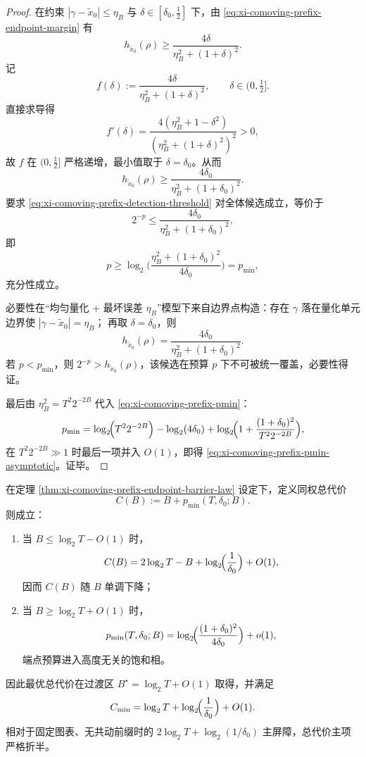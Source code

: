 \begin{proof}
在约束
\(
|\gamma-\tilde x_0|\le\eta_B
\)
与
\(
\delta\in[\delta_0,\tfrac12]
\)
下，由 \eqref{eq:xi-comoving-prefix-endpoint-margin} 有
\[
h_{\tilde x_0}(\rho)
\ge
\frac{4\delta}{\eta_B^2+(1+\delta)^2}.
\]
记
\[
f(\delta):=\frac{4\delta}{\eta_B^2+(1+\delta)^2},
\qquad
\delta\in(0,\tfrac12].
\]
直接求导得
\[
f'(\delta)
=
\frac{4(\eta_B^2+1-\delta^2)}{(\eta_B^2+(1+\delta)^2)^2}
>0,
\]
故 \(f\) 在 \((0,\tfrac12]\) 严格递增，最小值取于 \(\delta=\delta_0\)。从而
\[
h_{\tilde x_0}(\rho)
\ge
\frac{4\delta_0}{\eta_B^2+(1+\delta_0)^2}.
\]
要求 \eqref{eq:xi-comoving-prefix-detection-threshold} 对全体候选成立，等价于
\[
2^{-p}
\le
\frac{4\delta_0}{\eta_B^2+(1+\delta_0)^2},
\]
即
\[
p\ge
\log_2\!\Biggl(
\frac{\eta_B^2+(1+\delta_0)^2}{4\delta_0}
\Biggr)=p_{\min},
\]
充分性成立。

必要性在“均匀量化 + 最坏误差 \(\eta_B\)”模型下来自边界点构造：存在 \(\gamma\) 落在量化单元边界使
\(
|\gamma-\tilde x_0|=\eta_B
\)；
再取 \(\delta=\delta_0\)，则
\[
h_{\tilde x_0}(\rho)
=
\frac{4\delta_0}{\eta_B^2+(1+\delta_0)^2}.
\]
若 \(p<p_{\min}\)，则 \(2^{-p}>h_{\tilde x_0}(\rho)\)，该候选在预算 \(p\) 下不可被统一覆盖，必要性得证。

最后由 \(\eta_B^2=T^2 2^{-2B}\) 代入 \eqref{eq:xi-comoving-prefix-pmin}：
\[
p_{\min}
=
\log_2\!\Bigl(T^2 2^{-2B}\Bigr)
-\log_2(4\delta_0)
+\log_2\!\Bigl(1+\frac{(1+\delta_0)^2}{T^2 2^{-2B}}\Bigr),
\]
在 \(T^2 2^{-2B}\gg 1\) 时最后一项并入 \(O(1)\)，即得 \eqref{eq:xi-comoving-prefix-pmin-asymptotic}。证毕。
\end{proof}

\begin{corollary}\label{cor:xi-comoving-prefix-pareto-half-cost}
在定理 \ref{thm:xi-comoving-prefix-endpoint-barrier-law} 设定下，定义同权总代价
\[
C(B):=B+p_{\min}(T,\delta_0;B).
\]
则成立：
\begin{enumerate}
  \item 当 \(B\le \log_2 T-O(1)\) 时，
  \[
  C(B)
  =
  2\log_2 T-B+\log_2\!\Bigl(\frac1{\delta_0}\Bigr)+O(1),
  \]
  因而 \(C(B)\) 随 \(B\) 单调下降；
  \item 当 \(B\ge \log_2 T+O(1)\) 时，
  \[
  p_{\min}(T,\delta_0;B)
  =
  \log_2\!\Bigl(\frac{(1+\delta_0)^2}{4\delta_0}\Bigr)+o(1),
  \]
  端点预算进入高度无关的饱和相。
\end{enumerate}
因此最优总代价在过渡区 \(B^\star=\log_2 T+O(1)\) 取得，并满足
\[
C_{\min}
=
\log_2 T+\log_2\!\Bigl(\frac1{\delta_0}\Bigr)+O(1).
\]
相对于固定图表、无共动前缀时的 \(2\log_2 T+\log_2(1/\delta_0)\) 主屏障，总代价主项严格折半。
\end{corollary}


